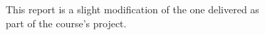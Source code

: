 \documentclass{article}
\begin{document}
\projecttitle
\begin{center}
\hfill \\
\hfill \\
\hfill \\
\hfill \\
\hfill \\
This report is a slight modification of the one delivered as \\
part of the course's project.
\end{center}
\clearpage

\tableofcontents
\clearpage


\clearpage


\clearpage


\clearpage


\clearpage


\clearpage

\medskip
\printbibliography
\end{document}
